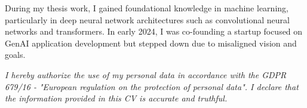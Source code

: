 \documentclass[10.5pt,a4paper]{article}
\begin{document}
\vspace{0.5ex}
During my thesis work, I gained foundational knowledge in machine learning, particularly in deep neural network architectures such as convolutional neural networks and transformers. In early 2024, I was co-founding a startup focused on GenAI application development but stepped down due to misaligned vision and goals.


\vfill
\begin{minipage}{\textwidth}
\footnotesize
\textit{I hereby authorize the use of my personal data in accordance with the GDPR 679/16 - "European regulation on the protection of personal data". I declare that the information provided in this CV is accurate and truthful.}
\end{minipage}
\end{document}
